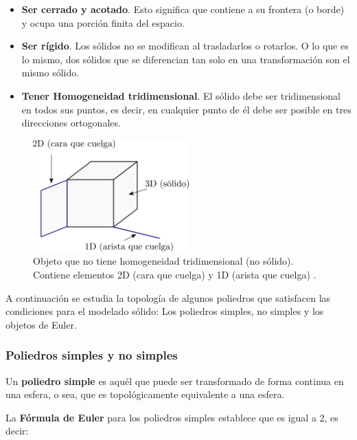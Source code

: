 \begin{itemize}
    \item \textbf{Ser cerrado y acotado}. 
    Esto significa que contiene a su frontera (o borde) y ocupa una porción finita del espacio.
    \item \textbf{Ser rígido}. Los sólidos no se modifican al trasladarlos o rotarlos. O lo que es lo mismo, dos sólidos que se diferencian tan solo en una transformación son el mismo sólido.
    \item \textbf{Tener Homogeneidad tridimensional}. El sólido debe ser tridimensional en todos sus puntos, es decir, en cualquier punto de él debe ser posible en tres direcciones ortogonales.
\end{itemize}



\begin{figure}[ht]
\includegraphics[width=6cm]{Img/GEO/geo-noregular.png}
\centering
\caption{\footnotesize{Objeto que no tiene homogeneidad tridimensional (no sólido). Contiene elementos 2D (cara que cuelga) y 1D (arista que cuelga)  \citep{Torres2014}.}}
\label{fig:geo-noregular}
\end{figure}


A continuación se estudia la topología de algunos poliedros que satisfacen las condiciones para el modelado sólido: Los poliedros simples, no simples y los objetos de Euler.\newline

\subsubsection{Poliedros simples y no simples}\newline
    Un \textbf{poliedro simple} es aquél que puede ser transformado de forma continua en una esfera, o sea, que es topológicamente equivalente a una esfera.

    La \textbf{Fórmula de Euler} para los poliedros simples
    establece que  \citet{Ramos2011} es igual a 2, es decir:

